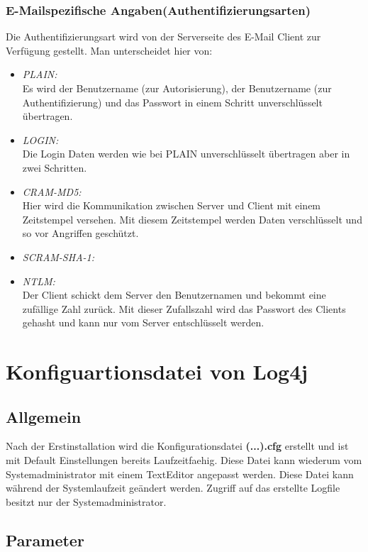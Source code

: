 \subsubsection{E-Mailspezifische Angaben(Authentifizierungsarten)}
Die Authentifizierungsart wird von der Serverseite des E-Mail Client zur Verfügung gestellt. Man unterscheidet hier von:

\begin{itemize}
	\item \emph{PLAIN:}\\
	Es wird der Benutzername (zur Autorisierung), der Benutzername (zur Authentifizierung) und das Passwort in einem Schritt unverschlüsselt übertragen.
	\item \emph{LOGIN:}\\
	Die Login Daten werden wie bei PLAIN unverschlüsselt übertragen aber in zwei Schritten.
	\item \emph{CRAM-MD5:}\\
	Hier wird die Kommunikation zwischen Server und Client mit einem Zeitstempel versehen. Mit diesem Zeitstempel werden Daten verschlüsselt und so vor Angriffen geschützt.
	\item \emph{SCRAM-SHA-1:}\\
	
	\item \emph{NTLM:}\\
	Der Client schickt dem Server den Benutzernamen und bekommt eine zufällige Zahl zurück. Mit dieser Zufallszahl wird das Passwort des Clients gehasht und kann nur vom Server entschlüsselt werden.
\end{itemize}

\section{Konfiguartionsdatei von Log4j}	

\subsection{Allgemein}

Nach der Erstinstallation wird die Konfigurationsdatei \textbf{(...).cfg} erstellt und ist mit Default Einstellungen bereits Laufzeitfaehig. Diese Datei kann wiederum vom Systemadministrator mit einem TextEditor angepasst werden. Diese Datei kann während der Systemlaufzeit geändert werden. Zugriff auf das erstellte Logfile besitzt nur der Systemadministrator.

\subsection{Parameter}

